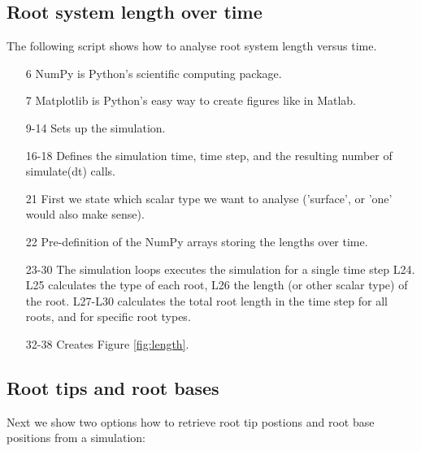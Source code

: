 \subsection{Root system length over time}

The following script shows how to analyse root system length versus time. 



\begin{itemize}

\item[6] NumPy is Python's scientific computing package.
\item[7] Matplotlib is Python's easy way to create figures like in Matlab.

\item[9-14] Sets up the simulation.

\item[16-18] Defines the simulation time, time step, and the resulting number of simulate(dt) calls. 

\item[21] First we state which scalar type we want to analyse ('surface', or 'one' would also make sense).

\item[22] Pre-definition of the NumPy arrays storing the lengths over time. 

\item[23-30] The simulation loops executes the simulation for a single time step L24. L25 calculates the type of each root, L26 the length (or other scalar type) of the root. L27-L30 calculates the total root length in the time step for all roots, and for specific root types.

\item[32-38] Creates Figure \ref{fig:length}.

\end{itemize}



\subsection{Root tips and root bases}

Next we show two options how to retrieve root tip postions and root base positions from a simulation:



